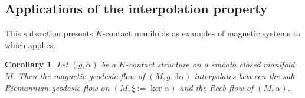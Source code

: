 \documentclass[11pt,reqno]{amsart}
\theoremstyle{plain}
\newtheorem{cor}[thm]{Corollary}
\theoremstyle{definition}
\numberwithin{equation}{section}
\def\d{\delta}
\def\d{\delta}
\def\RR{{\mathbb R}}
\def\d{{\mathrm{d}}}
\begin{document}
\subsection{Applications of the interpolation property}

This subsection presents $K$-contact manifolds as examples of magnetic systems to which
 applies. 

\begin{cor}
Let \((g,\alpha)\) be a \(K\)-contact structure on a smooth closed manifold
\(M\). Then the magnetic geodesic flow of \((M,g,\d\alpha)\) interpolates
between the sub-Riemannian geodesic flow on \((M,\xi:=\ker\alpha)\) and the
Reeb flow of \((M,\alpha)\).
\end{cor}
\end{document}
